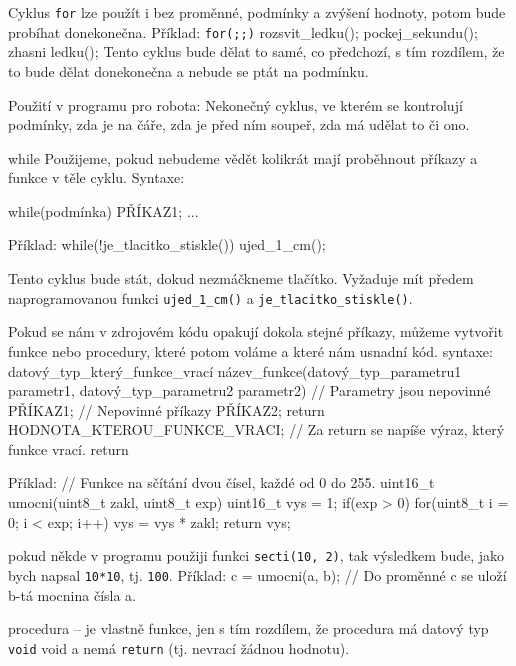 Cyklus { \tt  for} lze použít i bez proměnné, podmínky a zvýšení hodnoty, potom bude probíhat donekonečna.
Příklad:
{ \tt  for(;;)}
 \begtt 
{
  rozsvit_ledku();
  pockej_sekundu();
  zhasni ledku();
}
\endtt 
Tento cyklus bude dělat to samé, co předchozí, s tím rozdílem, že to bude dělat donekonečna a nebude se ptát na podmínku. 

Použití v programu pro robota: Nekonečný cyklus, ve kterém se kontrolují podmínky, zda je na čáře, zda je před ním soupeř, zda má udělat to či ono.



\ii while Použijeme, pokud nebudeme vědět kolikrát mají proběhnout příkazy a funkce v těle cyklu.
Syntaxe:

 \begtt 
while(podmínka)
{
  PŘÍKAZ1;
  ...
}
\endtt


Příklad:
 \begtt 
while(!je_tlacitko_stiskle())
{
  ujed_1_cm();
}
\endtt

Tento cyklus bude stát, dokud nezmáčkneme tlačítko. Vyžaduje mít předem naprogramovanou funkci { \tt  ujed\_1\_cm()} a { \tt  je\_tlacitko\_stiskle()}.

 
  

 Pokud se nám v zdrojovém kódu opakují dokola stejné příkazy, můžeme vytvořit \iid funkce nebo procedury, které potom voláme a které nám usnadní kód.
syntaxe:
 \begtt 
datový_typ_který_funkce_vrací název_funkce(datový_typ_parametru1 
parametr1, datový_typ_parametru2 parametr2) 
// Parametry jsou nepovinné
{
  PŘÍKAZ1; // Nepovinné příkazy
  PŘÍKAZ2;
  return HODNOTA_KTEROU_FUNKCE_VRACI; 
  // Za return se napíše výraz, který funkce vrací.
}
\endtt \ii return

Příklad:
 \begtt 
// Funkce na sčítání dvou čísel, každé od 0 do 255.
uint16_t umocni(uint8_t zakl, uint8_t exp)
{
  uint16_t vys = 1;
  if(exp > 0)
  {
    for(uint8_t i = 0; i < exp; i++)
    {
      vys = vys * zakl; 
    }
  }
  return vys;
}
\endtt

pokud někde v programu použiji funkci { \tt  secti(10, 2)}, tak výsledkem bude, jako bych napsal { \tt  10*10}, tj. { \tt  100}.
Příklad:
 \begtt 
c = umocni(a, b); // Do proměnné c se uloží b-tá mocnina čísla a. 
\endtt

\iid procedura -- je vlastně funkce, jen s tím rozdílem, že procedura má datový typ { \tt  void} \ii void  
a nemá { \tt  return} (tj. nevrací žádnou hodnotu).

